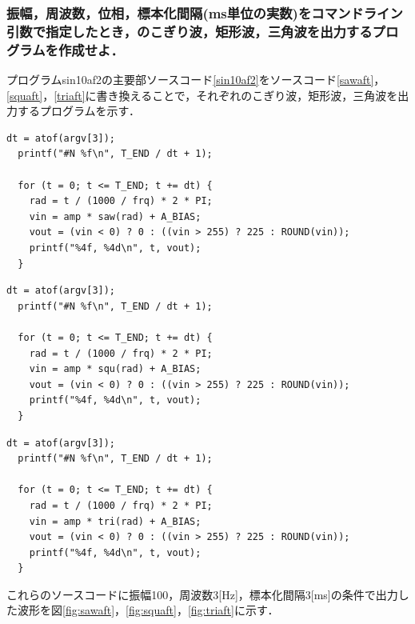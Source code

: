\documentclass[titlepage]{jarticle}
\begin{document}
\subsubsection{振幅，周波数，位相，標本化間隔(ms単位の実数)をコマンドライン引数で指定したとき，のこぎり波，矩形波，三角波を出力するプログラムを作成せよ．}
プログラムsin10af2の主要部ソースコード\ref{sin10af2}をソースコード\ref{sawaft}，\ref{squaft}，\ref{triaft}に書き換えることで，それぞれのこぎり波，矩形波，三角波を出力するプログラムを示す．
\begin{lstlisting}[caption=sawaft.c,label=sawaft]
  dt = atof(argv[3]);
  printf("#N %f\n", T_END / dt + 1);

  for (t = 0; t <= T_END; t += dt) {
    rad = t / (1000 / frq) * 2 * PI;
    vin = amp * saw(rad) + A_BIAS;
    vout = (vin < 0) ? 0 : ((vin > 255) ? 225 : ROUND(vin));
    printf("%4f, %4d\n", t, vout);
  }
\end{lstlisting}
\begin{lstlisting}[caption=squaft.c,label=squaft]
  dt = atof(argv[3]);
  printf("#N %f\n", T_END / dt + 1);

  for (t = 0; t <= T_END; t += dt) {
    rad = t / (1000 / frq) * 2 * PI;
    vin = amp * squ(rad) + A_BIAS;
    vout = (vin < 0) ? 0 : ((vin > 255) ? 225 : ROUND(vin));
    printf("%4f, %4d\n", t, vout);
  }
\end{lstlisting}
\begin{lstlisting}[caption=triaft.c,label=triaft]
  dt = atof(argv[3]);
  printf("#N %f\n", T_END / dt + 1);

  for (t = 0; t <= T_END; t += dt) {
    rad = t / (1000 / frq) * 2 * PI;
    vin = amp * tri(rad) + A_BIAS;
    vout = (vin < 0) ? 0 : ((vin > 255) ? 225 : ROUND(vin));
    printf("%4f, %4d\n", t, vout);
  }
\end{lstlisting}
これらのソースコードに振幅100，周波数3[Hz]，標本化間隔3[ms]の条件で出力した波形を図\ref{fig:sawaft}，\ref{fig:squaft}，\ref{fig:triaft}に示す．
\end{document}
